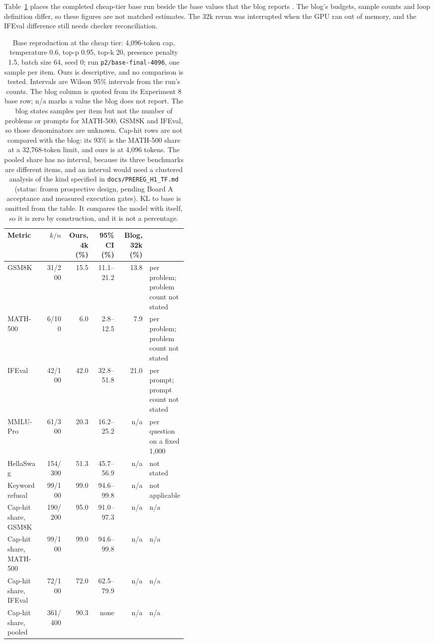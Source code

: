 Table~\ref{tab:base-repro} places the completed cheap-tier base run beside the base values that the blog reports \citep{takehi2026wsp}. The blog's budgets, sample counts and loop definition differ, so these figures are not matched estimates. The 32k rerun was interrupted when the GPU ran out of memory, and the IFEval difference still needs checker reconciliation.
\begin{table}[t]
\centering
\small
\begin{tabular}{>{\raggedright\arraybackslash}p{0.21\linewidth}rrrr>{\raggedright\arraybackslash}p{0.21\linewidth}}\toprule
Metric & $k/n$ & Ours, 4k (\%) & 95\% CI (\%) & Blog, 32k (\%) & \multicolumn{1}{c}{Blog samples per item} \\\midrule
GSM8K & 31/200 & 15.5 & 11.1--21.2 & 13.8 & 2 per problem; problem count not stated \\
MATH-500 & 6/100 & 6.0 & 2.8--12.5 & 7.9 & 4 per problem; problem count not stated \\
IFEval & 42/100 & 42.0 & 32.8--51.8 & 21.0 & 2 per prompt; prompt count not stated \\
MMLU-Pro & 61/300 & 20.3 & 16.2--25.2 & n/a & 1 per question on a fixed 1,000 \\
HellaSwag & 154/300 & 51.3 & 45.7--56.9 & n/a & not stated \\
Keyword refusal & 99/100 & 99.0 & 94.6--99.8 & n/a & not applicable \\
Cap-hit share, GSM8K & 190/200 & 95.0 & 91.0--97.3 & n/a & n/a \\
Cap-hit share, MATH-500 & 99/100 & 99.0 & 94.6--99.8 & n/a & n/a \\
Cap-hit share, IFEval & 72/100 & 72.0 & 62.5--79.9 & n/a & n/a \\
Cap-hit share, pooled & 361/400 & 90.3 & none & n/a & n/a \\\bottomrule
\end{tabular}
\caption{Base reproduction at the cheap tier: 4,096-token cap, temperature 0.6, top-p 0.95, top-k 20, presence penalty 1.5, batch size 64, seed 0; run \texttt{p2/base-final-4096}, one sample per item. Ours is descriptive, and no comparison is tested. Intervals are Wilson 95\% intervals from the run's counts. The blog column is quoted from its Experiment 8 base row; n/a marks a value the blog does not report. The blog states samples per item but not the number of problems or prompts for MATH-500, GSM8K and IFEval, so those denominators are unknown. Cap-hit rows are not compared with the blog: its 93\% is the MATH-500 share at a 32,768-token limit, and ours is at 4,096 tokens. The pooled share has no interval, because its three benchmarks are different items, and an interval would need a clustered analysis of the kind specified in \texttt{docs/PREREG\_H1\_TF.md} (status: frozen prospective design, pending Board A acceptance and measured execution gates). KL to base is omitted from the table. It compares the model with itself, so it is zero by construction, and it is not a percentage.}
\label{tab:base-repro}
\end{table}

